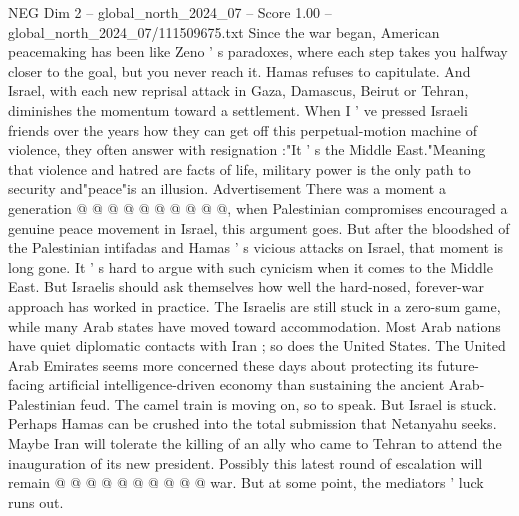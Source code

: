 \begin{textsample}{NEG Dim 2 – global\_north\_2024\_07 – Score 1.00 – global\_north\_2024\_07/111509675.txt}
Since the war began, American peacemaking has been like Zeno ' s paradoxes, where each step takes you halfway closer to the goal, but you never reach it.
Hamas refuses to capitulate.
And Israel, with each new reprisal attack in Gaza, Damascus, Beirut or Tehran, diminishes the momentum toward a settlement.
When I ' ve pressed Israeli friends over the years how they can get off this perpetual-motion machine of violence, they often answer with resignation :"It ' s the Middle East."Meaning that violence and hatred are facts of life, military power is the only path to security and"peace"is an illusion.
Advertisement There was a moment a generation @ @ @ @ @ @ @ @ @ @, when Palestinian compromises encouraged a genuine peace movement in Israel, this argument goes.
But after the bloodshed of the Palestinian intifadas and Hamas ' s vicious attacks on Israel, that moment is long gone.
It ' s hard to argue with such cynicism when it comes to the Middle East.
But Israelis should ask themselves how well the hard-nosed, forever-war approach has worked in practice.
The Israelis are still stuck in a zero-sum game, while many Arab states have moved toward accommodation.
Most Arab nations have quiet diplomatic contacts with Iran ; so does the United States.
The United Arab Emirates seems more concerned these days about protecting its future-facing artificial intelligence-driven economy than sustaining the ancient Arab-Palestinian feud.
The camel train is moving on, so to speak.
But Israel is stuck.
Perhaps Hamas can be crushed into the total submission that Netanyahu seeks.
Maybe Iran will tolerate the killing of an ally who came to Tehran to attend the inauguration of its new president.
Possibly this latest round of escalation will remain @ @ @ @ @ @ @ @ @ @ war.
But at some point, the mediators ' luck runs out.

\end{textsample}
